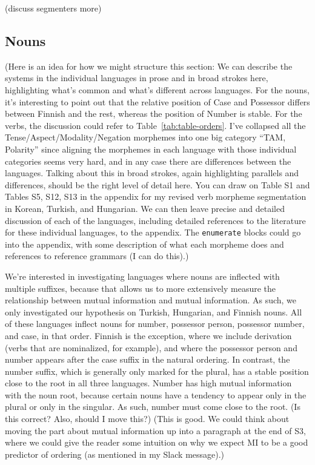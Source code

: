 \documentclass[11pt,letterpaper]{article}
\newcommand\mhahn[1]{{\color{red}(#1)}}
\newcommand\becky[1]{{\color{blue}(#1)}}
\begin{document}
\becky{discuss segmenters more} 

\subsection{Nouns}

\mhahn{Here is an idea for how we might structure this section: We can describe the systems in the individual languages in prose and in broad strokes here, highlighting what's common and what's different across languages. For the nouns, it's interesting to point out that the relative position of Case and Possessor differs between Finnish and the rest, whereas the position of Number is stable. For the verbs, the discussion could refer to Table~\ref{tab:table-orders}. I've collapsed all the Tense/Aspect/Modality/Negation morphemes into one big category ``TAM, Polarity'' since aligning the morphemes in each language with those individual categories seems very hard, and in any case there are differences between the languages. Talking about this in broad strokes, again highlighting parallels and differences, should be the right level of detail here. You can draw on Table S1 and Tables S5, S12, S13 in the appendix for my revised verb morpheme segmentation in Korean, Turkish, and Hungarian. We can then leave precise and detailed discussion of each of the languages, including detailed references to the literature for these individual languages, to the appendix. The \texttt{enumerate} blocks could go into the appendix, with some description of what each morpheme does and references to reference grammars (I can do this).}

We're interested in investigating languages where nouns are inflected with multiple suffixes, because that allows us to more extensively measure the relationship between mutual information and mutual information. As such, we only investigated our hypothesis on Turkish, Hungarian, and Finnish nouns. All of these languages inflect nouns for number, possessor person, possessor number, and case, in that order. Finnish is the exception, where we include derivation (verbs that are nominalized, for example), and where the possessor person and number appears after the case suffix in the natural ordering. 
In contrast, the number suffix, which is generally only marked for the plural, has a stable position close to the root in all three languages. Number has high mutual information with the noun root, because certain nouns have a tendency to appear only in the plural or only in the singular. As such, number must come close to the root. \becky{Is this correct? Also, should I move this?}
\mhahn{This is good. We could think about moving the part about mutual information up into a paragraph at the end of S3, where we could give the reader some intuition on why we expect MI to be a good predictor of ordering (as mentioned in my Slack message).}
\end{document}
